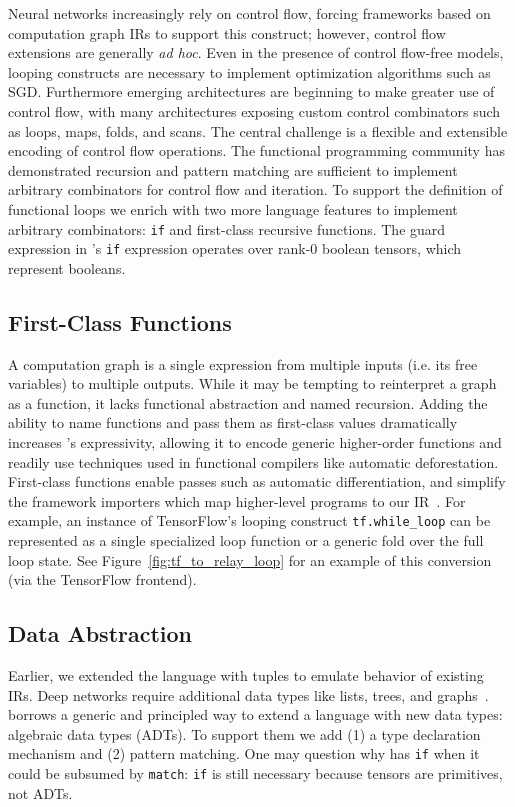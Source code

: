   Neural networks increasingly rely on control flow, forcing frameworks based on computation graph IRs
  to support this construct; however, control flow extensions are generally \textit{ad hoc}.
  Even in the presence of control flow-free models, looping
    constructs are necessary to implement optimization algorithms
    such as SGD.
  Furthermore emerging architectures are beginning to make greater use of
     control flow, with many architectures exposing custom control
     combinators such as loops, maps, folds, and scans.
  The central challenge is a flexible and extensible encoding of
    control flow operations.
  The functional programming community has demonstrated recursion and pattern matching are sufficient
    to implement arbitrary combinators for control flow and iteration.
  To support the definition of functional loops we enrich \relay with two more language
    features to implement arbitrary combinators: \verb|if| and first-class recursive functions.
  The guard expression in \relay's \verb|if| expression operates over rank-0 boolean tensors,
    which represent booleans.

  \subsection{First-Class Functions}

  A computation graph is a single expression
    from multiple inputs (i.e. its free variables) to multiple outputs.
  While it may be tempting to reinterpret a graph as a function, it lacks functional abstraction
    and named recursion.
  Adding the ability to name functions and pass them as first-class values dramatically increases
    \relay's expressivity, allowing it to encode generic
    higher-order functions and readily use techniques used in functional
    compilers like automatic deforestation.
  First-class functions enable passes such as
    automatic differentiation, and simplify
    the framework importers which map higher-level programs to our IR~\citep{myia}.
  For example, an instance of TensorFlow's looping construct \verb|tf.while_loop|
    can be represented as a single specialized loop function
    or a generic fold over the full loop state.
  See Figure~\ref{fig:tf_to_relay_loop} for an example of this conversion (via
    the \relay TensorFlow frontend).

  \subsection{Data Abstraction}
  Earlier, we extended the language with tuples to
    emulate behavior of existing IRs.
  Deep networks require additional data types like lists,
    trees, and graphs~\citep{char-rnn, tree_lstm, graph_lstm}.
  \relay borrows a generic and principled way to
    extend a language with new data types:
    algebraic data types (ADTs).
  To support them we add (1) a type declaration mechanism and
    (2) pattern matching.
  One may question why \relay has \verb|if| when it could be subsumed by \verb|match|:
    \verb|if| is still necessary because tensors are primitives, not ADTs.

